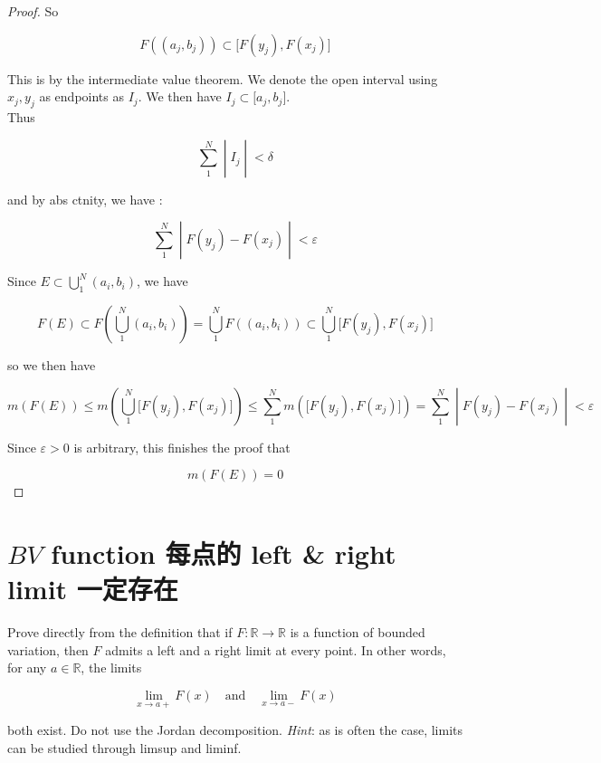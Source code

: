 \begin{proof}
So

\[F((a_{j},b_{j})) \subset \lbrack F(y_{j}),F(x_{j})\rbrack\]

This is by the intermediate value theorem. We denote the open interval using \(x_{j},y_{j}\) as endpoints as \(I_{j}\). We then have \(I_{j} \subset \lbrack a_{j},b_{j}\rbrack\).\\
Thus

\[\left. \sum\limits_{1}^{N} \middle| I_{j} \middle| < \delta \right.\]

and by abs ctnity, we have :

\[\left. \sum\limits_{1}^{N} \middle| F(y_{j}) - F(x_{j}) \middle| < \varepsilon \right.\]

Since \(E \subset \bigcup_{1}^{N}(a_{i},b_{i})\), we have

\[F(E) \subset F(\bigcup\limits_{1}^{N}(a_{i},b_{i})) = \bigcup\limits_{1}^{N}F((a_{i},b_{i})) \subset \bigcup\limits_{1}^{N}\lbrack F(y_{j}),F(x_{j})\rbrack\]

so we then have

\[\left. m(F(E)) \leq m(\bigcup\limits_{1}^{N}\lbrack F(y_{j}),F(x_{j})\rbrack) \leq \sum\limits_{1}^{N}m(\lbrack F(y_{j}),F(x_{j})\rbrack) = \sum\limits_{1}^{N} \middle| F(y_{j}) - F(x_{j}) \middle| < \varepsilon \right.\]

Since \(\varepsilon > 0\) is arbitrary, this finishes the proof that

\[m(F(E)) = 0\]

\end{proof}

\section{\texorpdfstring{\(BV\) function 每点的 left \& right limit 一定存在}{BV function 每点的 left \& right limit 一定存在}}\label{bv-function-ux6bcfux70b9ux7684-left-right-limit-ux4e00ux5b9aux5b58ux5728}

Prove directly from the definition that if \(F:\mathbb{R}\rightarrow\mathbb{R}\) is a function of bounded variation, then \(F\) admits a left and a right limit at every point. In other words, for any \(a \in \mathbb{R}\), the limits

\[\lim\limits_{x\rightarrow a +}F(x)\quad\text{and}\quad\lim\limits_{x\rightarrow a -}F(x)\]

both exist. Do not use the Jordan decomposition. \emph{Hint}: as is often the case, limits can be studied through limsup and liminf.

